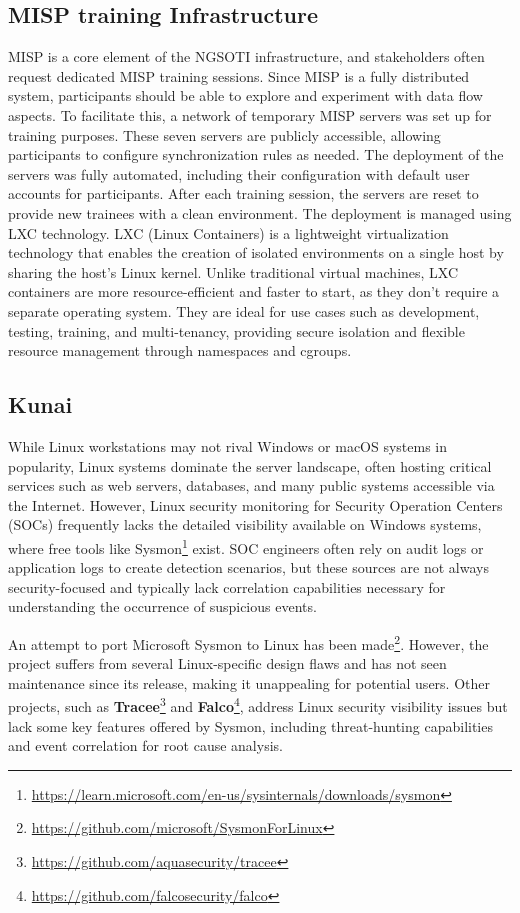 \subsection{MISP training Infrastructure}
MISP is a core element of the NGSOTI infrastructure, and stakeholders often request dedicated MISP training sessions. Since MISP is a fully distributed system, participants should be able to explore and experiment with data flow aspects. To facilitate this, a network of temporary MISP servers was set up for training purposes. These seven servers are publicly accessible, allowing participants to configure synchronization rules as needed. The deployment of the servers was fully automated, including their configuration with default user accounts for participants. After each training session, the servers are reset to provide new trainees with a clean environment. The deployment is managed using LXC technology. LXC (Linux Containers) is a lightweight virtualization technology that enables the creation of isolated environments on a single host by sharing the host's Linux kernel. Unlike traditional virtual machines, LXC containers are more resource-efficient and faster to start, as they don't require a separate operating system. They are ideal for use cases such as development, testing, training, and multi-tenancy, providing secure isolation and flexible resource management through namespaces and cgroups.


\subsection{Kunai}

While Linux workstations may not rival Windows or macOS systems in popularity, Linux systems dominate the server landscape, often hosting critical services such as web servers, databases, and many public systems accessible via the Internet. However, Linux security monitoring for Security Operation Centers (SOCs) frequently lacks the detailed visibility available on Windows systems, where free tools like Sysmon\footnote{\href{https://learn.microsoft.com/en-us/sysinternals/downloads/sysmon}{https://learn.microsoft.com/en-us/sysinternals/downloads/sysmon}} exist. SOC engineers often rely on audit logs or application logs to create detection scenarios, but these sources are not always security-focused and typically lack correlation capabilities necessary for understanding the occurrence of suspicious events.

An attempt to port Microsoft Sysmon to Linux has been made\footnote{\href{https://github.com/microsoft/SysmonForLinux}{https://github.com/microsoft/SysmonForLinux}}. However, the project suffers from several Linux-specific design flaws and has not seen maintenance since its release, making it unappealing for potential users. Other projects, such as \textbf{Tracee}\footnote{\href{https://github.com/aquasecurity/tracee}{https://github.com/aquasecurity/tracee}} and \textbf{Falco}\footnote{\href{https://github.com/falcosecurity/falco}{https://github.com/falcosecurity/falco}}, address Linux security visibility issues but lack some key features offered by Sysmon, including threat-hunting capabilities and event correlation for root cause analysis.

